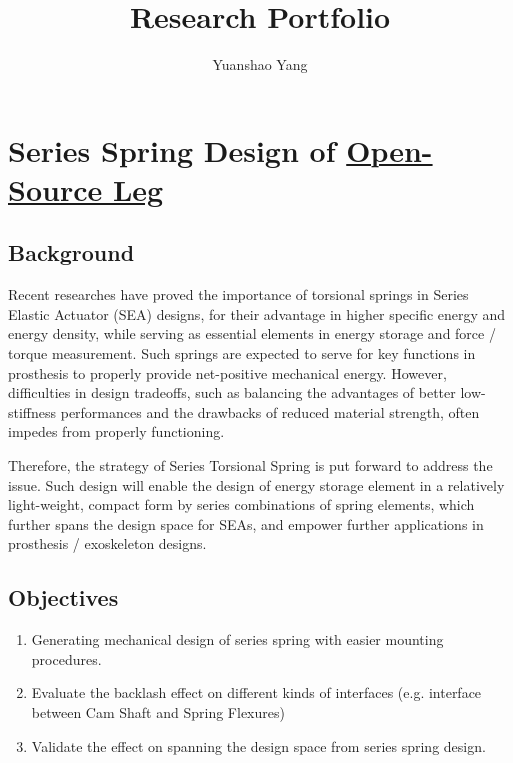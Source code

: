 \documentclass[12pt]{article}
\title{Research Portfolio}
\author{Yuanshao Yang}
\begin{document}
\maketitle


\tableofcontents
\newpage

\section{Series Spring Design of \href{https://www.opensourceleg.org/}{Open-Source Leg}}

\subsection{Background}


Recent researches have proved the importance of torsional springs in Series Elastic Actuator (SEA) designs, for their advantage in higher specific energy and energy density, while serving as essential elements in energy storage and force / torque measurement. Such springs are expected to serve for key functions in prosthesis to properly provide net-positive mechanical energy. However, difficulties in design tradeoffs, such as balancing the advantages of better low-stiffness performances and the drawbacks of reduced material strength, often impedes from properly functioning. 


Therefore, the strategy of Series Torsional Spring is put forward to address the issue. Such design will enable the design of energy storage element in a relatively light-weight, compact form by series combinations of spring elements, which further spans the design space for SEAs, and empower further applications in prosthesis / exoskeleton designs. 

\subsection{Objectives}

\begin{enumerate}

    \item {Generating mechanical design of series spring with easier mounting procedures.}
    \item {Evaluate the backlash effect on different kinds of interfaces (e.g. interface between Cam Shaft and Spring Flexures)}
    \item {Validate the effect on spanning the design space from series spring design.}

\end{enumerate}
\end{document}
